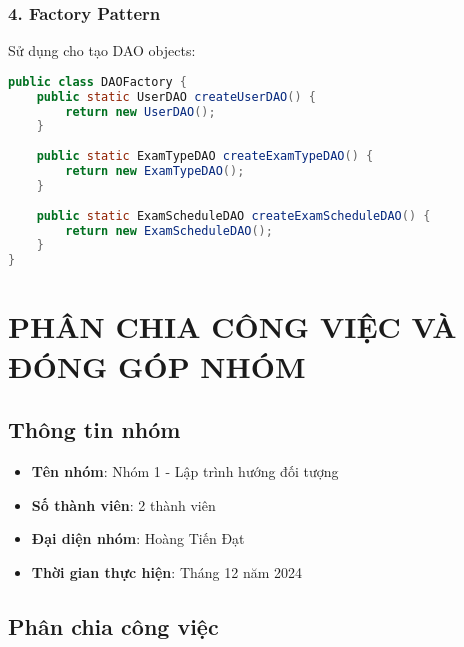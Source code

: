 \documentclass[12pt,a4paper]{article}
\begin{document}
\subsubsection{4. Factory Pattern}

Sử dụng cho tạo DAO objects:

\begin{lstlisting}[language=Java, caption=Factory Pattern cho DAO creation]
public class DAOFactory {
    public static UserDAO createUserDAO() {
        return new UserDAO();
    }
    
    public static ExamTypeDAO createExamTypeDAO() {
        return new ExamTypeDAO();
    }
    
    public static ExamScheduleDAO createExamScheduleDAO() {
        return new ExamScheduleDAO();
    }
}
\end{lstlisting}

 \section{PHÂN CHIA CÔNG VIỆC VÀ ĐÓNG GÓP NHÓM}

 \subsection{Thông tin nhóm}

 \begin{itemize}
     \item \textbf{Tên nhóm}: Nhóm 1 - Lập trình hướng đối tượng
     \item \textbf{Số thành viên}: 2 thành viên
     \item \textbf{Đại diện nhóm}: Hoàng Tiến Đạt
     \item \textbf{Thời gian thực hiện}: Tháng 12 năm 2024
 \end{itemize}

 \subsection{Phân chia công việc}
\end{document}
